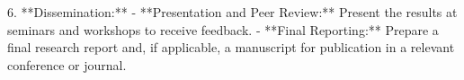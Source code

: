 \documentclass[12pt,a4paper]{article}
\begin{document}
6. **Dissemination:**
   - **Presentation and Peer Review:**  
     Present the results at seminars and workshops to receive feedback.
   - **Final Reporting:**  
     Prepare a final research report and, if applicable, a manuscript for publication in a relevant conference or journal.





\printbibliography
\end{document}
